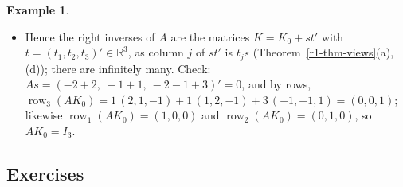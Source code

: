 \documentclass[12pt]{article}
\newcommand{\R}{\mathbb R}
\DeclareMathOperator{\row}{row}
\DeclareMathOperator{\col}{col}
\theoremstyle{definition}
\newtheorem{example}[theorem]{Example}
\begin{document}
\begin{example}
\begin{itemize}
\[\]
The unknown \(x_4\) is free; with \(x_4=t_j\), Proposition~\ref{r2-prop-solutions}(b) gives \(x_1=k_{1j}-2t_j\),
\(x_2=k_{2j}-t_j\), \(x_3=k_{3j}\), where \(k_{ij}\) are the entries of \(K_0\). So the solutions are
\(x=\col_j(K_0)+t_js\) (\(t_j\in\R\)).
\item Hence the right inverses of \(A\) are the matrices \(K=K_0+st'\) with \(t=(t_1,t_2,t_3)'\in\R^3\), as column \(j\) of
\(st'\) is \(t_js\) (Theorem~\ref{r1-thm-views}(a),(d)); there are infinitely many. Check: \(As=(-2+2,\ -1+1,\ -2-1+3)'=0\),
and by rows, \(\row_3(AK_0)=1\,(2,1,-1)+1\,(1,2,-1)+3\,(-1,-1,1)=(0,0,1)\); likewise \(\row_1(AK_0)=(1,0,0)\) and
\(\row_2(AK_0)=(0,1,0)\), so \(AK_0=I_3\).
\end{itemize}
\end{example}

\subsection*{Exercises}
\end{document}
